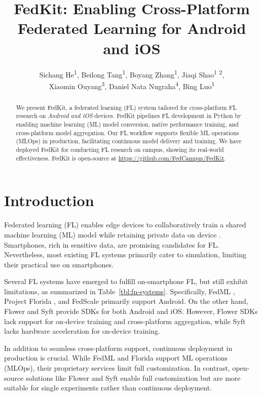 \documentclass[letterpaper]{article} %
\title{FedKit: Enabling Cross-Platform Federated Learning for Android and iOS}
\author{
    Sichang He\textsuperscript{\rm 1},
    Beilong Tang\textsuperscript{\rm 1},
    Boyang Zhang\textsuperscript{\rm 1},
    Jiaqi Shao\textsuperscript{\rm 1} \textsuperscript{\rm 2},
    \\
    Xiaomin Ouyang\textsuperscript{\rm 3},
    Daniel Nata Nugraha\textsuperscript{\rm 4},
    Bing Luo\textsuperscript{\rm 1}
}
\begin{document}
\maketitle

\begin{abstract}
    We present FedKit, a federated learning (FL) system tailored for
    cross-platform FL research on \textit{Android and iOS} devices.
    FedKit pipelines FL development in Python by
    enabling machine learning (ML) model conversion,
    native performance training,
    and cross-platform model aggregation.
    Our FL workflow supports flexible ML operations (MLOps) in production,
    facilitating continuous model delivery and training.
    We have deployed FedKit for conducting FL research on campus,
    showing its real-world effectiveness.
    FedKit is open-source at \url{https://github.com/FedCampus/FedKit}.
\end{abstract}

\section{Introduction}

Federated learning (FL) enables edge devices to
collaboratively train a shared machine learning (ML) model while
retaining private data on device \cite{mcmahan2017communication}.
Smartphones, rich in sensitive data,
are promising candidates for FL.
Nevertheless, most existing FL systems
\cite[e.g.,][]{bonawitz2019towards,liu2021fate,ma2019paddlepaddle,openfl_citation}
primarily cater to simulation,
limiting their practical use on smartphones.

Several FL systems have emerged to fulfill on-smartphone FL,
but still exhibit limitations,
as summarized in Table~\ref{tbl:fn-systems}.
Specifically, FedML \cite{he2020fedml},
Project Florida \cite{madrigal2023project},
and FedScale \cite{lai2022fedscale} primarily support Android.
On the other hand,
Flower \cite{beutel2020flower,mathur2021ondevice} and
Syft \cite{ryffel2018generic,Ziller2021,hall2021syft}
provide SDKs for both Android and iOS.
However, Flower SDKs lack support for on-device training and
cross-platform aggregation,
while Syft lacks hardware acceleration for on-device training.

In addition to seamless cross-platform support,
continuous deployment in production is crucial.
While FedML and Florida support ML operations (MLOps),
their proprietary services limit full customization.
In contrast, open-source solutions like Flower and Syft enable
full customization
but are more suitable for single experiments rather than continuous deployment.
\end{document}
